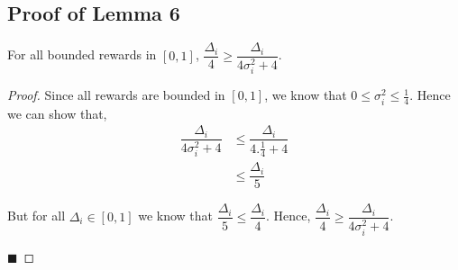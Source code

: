 %
%

\subsection{Proof of Lemma 6}
\label{App:Lemma:6}
\begin{lemma}
For all bounded rewards in $[0,1]$, $\dfrac{\Delta_i}{4} \geq \dfrac{\Delta_i}{4\sigma_i^2 + 4} $.
\end{lemma}

\begin{proof}
Since all rewards are bounded in $[0,1]$, we know that $0\leq\sigma_i^2 \leq \frac{1}{4}$. Hence we can show that,
\begin{align*}
\dfrac{\Delta_i}{4\sigma_i^2 + 4} &\leq \dfrac{\Delta_i}{4.\frac{1}{4} + 4}\\
& \leq \dfrac{\Delta_i}{5}
\end{align*}
 
But for all $\Delta_i \in [0,1]$ we know that $\dfrac{\Delta_{i}}{5} \leq \dfrac{\Delta_{i}}{4} $. Hence, 
$\dfrac{\Delta_i}{4} \geq \dfrac{\Delta_i}{4\sigma_i^2 + 4} $.

\hfill $\blacksquare$	
\end{proof}



